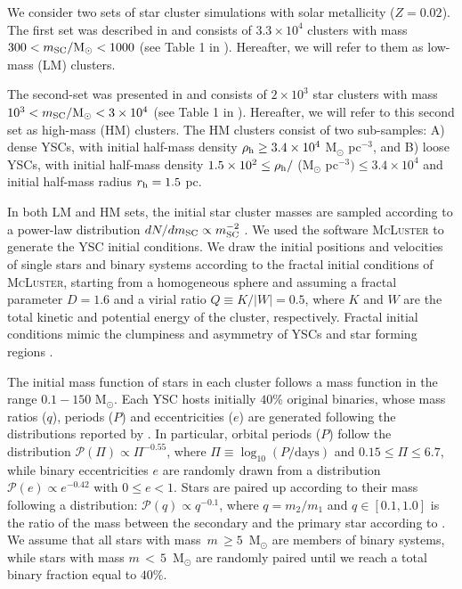 \documentclass[fleqn,usenatbib]{mnras}
\newcommand{\Ms}{M$_\odot$}
\begin{document}
 
We consider two sets of star cluster simulations with solar metallicity ($Z=0.02$). The first set was described in \cite{Rastello20} and consists of $3.3\times{}10^4$ clusters with mass  $300 <m_{\rm SC}/{\rm M}_\odot{}< 1000$ (see Table 1 in \citealt{Rastello20}). Hereafter, we will refer to them as low-mass (LM) clusters. 

The second-set was presented in \cite{dicarlo20} and consists of $2\times{}10^3$ star clusters with mass $10^{3} <m_{\rm SC}/{\rm M}_\odot{}< 3\times 10^{4}$ (see Table 1 in \citealt{dicarlo20}). Hereafter, we will refer to this second set as high-mass (HM) clusters. The HM clusters consist of two sub-samples: A) dense YSCs, with initial half-mass density $\rho_{\rm h}\ge{}3.4\times10^4$ M$_\odot$ pc$^{-3}$,  and B) loose YSCs, 
 with initial half-mass density $1.5\times10^2 \le{} \rho_{\rm h}/$ (M$_\odot$ pc$^{-3}) \le{}3.4\times10^4$ and initial half-mass radius $r_{\rm h}=1.5$ pc. 

 In both LM and HM sets, the initial star cluster masses are sampled according to a power-law distribution $dN/dm_{\rm SC}\propto m_{\rm SC}^{-2}$ \citep{lada2003}. We used the software 
\textsc{McLuster} \citep{Kupper11} to generate the YSC initial conditions. 
We draw the initial positions and velocities of single stars and binary systems according to the fractal initial conditions of \textsc{McLuster}, starting from a homogeneous sphere and assuming a fractal parameter $D=1.6$ and a virial ratio $Q\equiv{K/|W|}=0.5$, where $K$ and $W$ are the total kinetic and potential energy of the cluster, respectively.  Fractal initial conditions mimic the clumpiness and asymmetry of YSCs and star forming regions \citep{ballone2020,ballone2021,torniamenti2021}. 

The initial mass function of stars in each cluster follows a \cite{kroupa2001} mass function in the range $0.1-150$ \Ms. 
Each YSC hosts initially $40$\% original binaries, whose mass ratios ($q$), periods ($P$) and eccentricities ($e$) are generated following the distributions reported by \cite{sana12}. In particular, orbital periods ($P$) follow the distribution
$\mathcal{P}(\Pi)\propto{}\Pi^{-0.55}$, where $\Pi\equiv{}\log_{10}(P/\mathrm{days})$
and $0.15\leq{}\Pi\leq{}6.7$, while binary eccentricities $e$
are randomly drawn from a distribution $\mathcal{P}(e)\propto{}e^{-0.42}$ with
$0\leq{}e<1$. Stars are paired up according to their mass following a distribution:
$\mathcal{P}(q)\propto{}q^{-0.1}$, where $q=m_2/m_1$ and $q \in [0.1,1.0]$ is the ratio of the mass between
the secondary and the primary star according to \cite{sana12}.
We assume that all stars with mass $\,m\,\ge{}5$~\Ms{} are members of binary systems, while stars with mass
$m\,<\,5$~\Ms{} are randomly paired until we reach a total binary fraction equal to $40$\%. 
\end{document}
